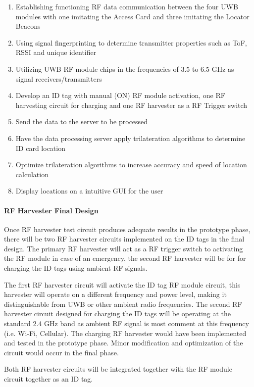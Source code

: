 \begin{enumerate}
    \item Establishing functioning RF data communication between the four UWB modules with 
    one imitating the Access Card and three imitating the Locator Beacons
    \item Using signal fingerprinting to determine transmitter properties such as ToF, RSSI 
    and unique identifier
    \item Utilizing UWB RF module chips in the frequencies of 3.5 to 6.5 GHz as signal receivers/transmitters
    \item Develop an ID tag with manual (ON) RF module activation, one RF harvesting circuit 
    for charging and one RF harvester as a RF Trigger switch
    \item Send the data to the server to be processed
    \item Have the data processing server apply trilateration algorithms to determine ID card location
    \item Optimize trilateration algorithms to increase accuracy and speed of location calculation
    \item Display locations on a intuitive GUI for the user
\end{enumerate}

\break
\paragraph{RF Harvester Final Design}
\bigskip
Once RF harvester test circuit produces adequate results in the prototype phase, there will be two RF harvester circuits implemented on the ID tags in the final design. The primary RF harvester will act as a RF trigger switch to activating the RF module in case of an emergency, the second RF harvester will be for for charging the ID tags using ambient RF signals. 

\bigskip
The first RF harvester circuit will activate the ID tag RF module circuit, this harvester will operate 
on a different frequency and power level, making it distinguishable from UWB or other ambient radio frequencies. The second RF harvester circuit designed for charging the ID tags will be operating at the standard 2.4 GHz band  as ambient RF signal is most comment at this frequency (i.e. Wi-Fi, Cellular). The charging RF harvester would have been implemented and tested in the prototype phase. Minor modification and optimization of the circuit would occur in the final phase.

\bigskip
Both RF harvester circuits will be integrated together with the RF module circuit together as an ID tag.

